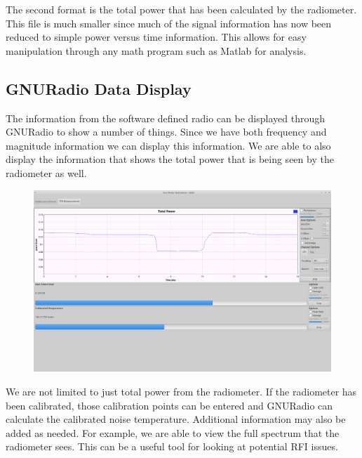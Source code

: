 The second format is the total power that has been calculated by the radiometer.  This file is much smaller since much of the signal information has now been reduced to simple power versus time information.  This allows for easy manipulation through any math program such as Matlab for analysis.  

\subsection{GNURadio Data Display}
The information from the software defined radio can be displayed through GNURadio to show a number of things.  Since we have both frequency and magnitude information we can display this information.  We are able to also display the information that shows the total power that is being seen by the radiometer as well.

{\begin{figure}[h!tb] 
\centering
\includegraphics[width=17cm]{Images/Lab1_TPR_at_end_exp.png}
\label{radiometer_tpr_display}
\end{figure}
}

We are not limited to just total power from the radiometer.  If the radiometer has been calibrated, those calibration points can be entered and GNURadio can calculate the calibrated noise temperature.  Additional information may also be added as needed.  For example, we are able to view the full spectrum that the radiometer sees.  This can be a useful tool for looking at potential RFI issues.  

